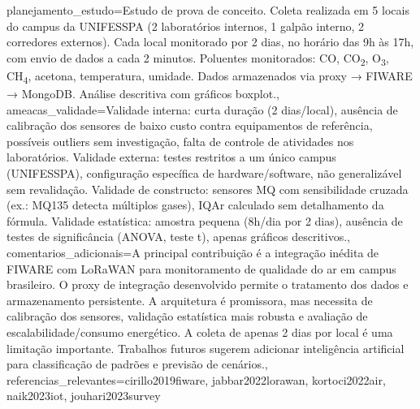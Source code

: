 \documentclass[12pt,a4paper]{article}
\begin{document}
{  planejamento_estudo={Estudo de prova de conceito. Coleta realizada em 5 locais do campus da UNIFESSPA (2 laboratórios internos, 1 galpão interno, 2 corredores externos). Cada local monitorado por 2 dias, no horário das 9h às 17h, com envio de dados a cada 2 minutos. Poluentes monitorados: CO, CO\textsubscript{2}, O\textsubscript{3}, CH\textsubscript{4}, acetona, temperatura, umidade. Dados armazenados via proxy → FIWARE → MongoDB. Análise descritiva com gráficos boxplot.},
  ameacas_validade={Validade interna: curta duração (2 dias/local), ausência de calibração dos sensores de baixo custo contra equipamentos de referência, possíveis outliers sem investigação, falta de controle de atividades nos laboratórios. Validade externa: testes restritos a um único campus (UNIFESSPA), configuração específica de hardware/software, não generalizável sem revalidação. Validade de constructo: sensores MQ com sensibilidade cruzada (ex.: MQ135 detecta múltiplos gases), IQAr calculado sem detalhamento da fórmula. Validade estatística: amostra pequena (8h/dia por 2 dias), ausência de testes de significância (ANOVA, teste t), apenas gráficos descritivos.},
  comentarios_adicionais={A principal contribuição é a integração inédita de FIWARE com LoRaWAN para monitoramento de qualidade do ar em campus brasileiro. O proxy de integração desenvolvido permite o tratamento dos dados e armazenamento persistente. A arquitetura é promissora, mas necessita de calibração dos sensores, validação estatística mais robusta e avaliação de escalabilidade/consumo energético. A coleta de apenas 2 dias por local é uma limitação importante. Trabalhos futuros sugerem adicionar inteligência artificial para classificação de padrões e previsão de cenários.},
  referencias_relevantes={cirillo2019fiware, jabbar2022lorawan, kortoci2022air, naik2023iot, jouhari2023survey}
}
\end{document}
